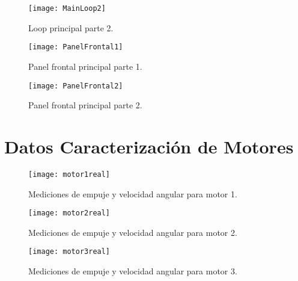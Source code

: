 \documentclass[../main.tex]{subfiles}
\begin{document}
\begin{landscape}
\begin{figure}
\begin{centering}
\texttt{[image: MainLoop2]}
\par\end{centering}
\caption{Loop principal parte 2. }
\end{figure}

\begin{figure}
\begin{centering}
\texttt{[image: PanelFrontal1]}
\par\end{centering}
\caption{Panel frontal principal parte 1.}
\end{figure}

\begin{figure}
\begin{centering}
\texttt{[image: PanelFrontal2]}
\par\end{centering}
\caption{Panel frontal principal parte 2.}
\end{figure}

\end{landscape}

\section*{Datos Caracterización de Motores}

\begin{figure}
\begin{centering}
\texttt{[image: motor1real]}
\par\end{centering}
\caption{Mediciones de empuje y velocidad angular para motor 1.}
\end{figure}

\begin{figure}
\begin{centering}
\texttt{[image: motor2real]}
\par\end{centering}
\caption{Mediciones de empuje y velocidad angular para motor 2.}
\end{figure}

\begin{figure}
\begin{centering}
\texttt{[image: motor3real]}
\par\end{centering}
\caption{Mediciones de empuje y velocidad angular para motor 3.}
\end{figure}
\end{document}
